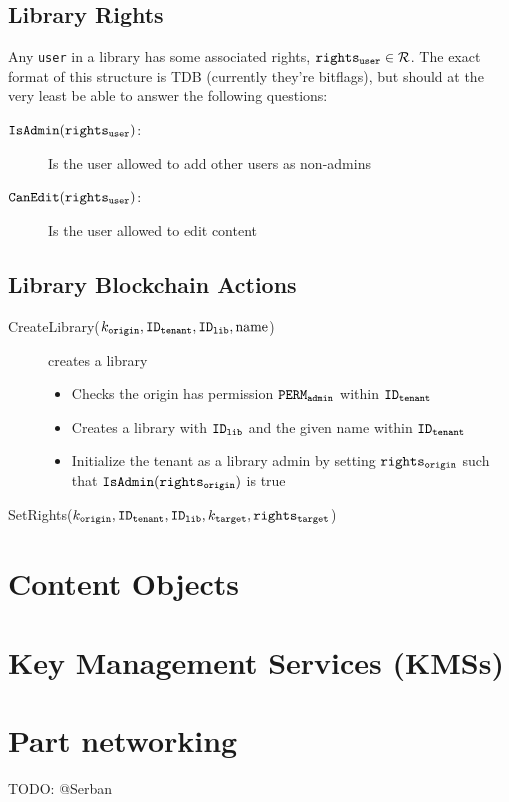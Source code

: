 \documentclass{article}
\begin{document}
\subsection{Library Rights}
Any \texttt{user} in a library has some associated rights, $\mathtt{rights_{user}} \in \mathcal{R}$. 
The exact format of this structure is TDB (currently they're bitflags), but should at the very least be able to answer the following questions:

\begin{description}
  \item[$\mathtt{IsAdmin}(\mathtt{rights_{user}})$:] Is the user allowed to add other users as non-admins
  \item[$\mathtt{CanEdit}(\mathtt{rights_{user}})$:]  Is the user allowed to edit content
\end{description}

\subsection{Library Blockchain Actions}

\begin{description}
  \item[CreateLibrary($k_\mathtt{origin}, \mathtt{ID_{tenant}}, \mathtt{ID_{lib}}, \textnormal{name}$)] creates a library
    \begin{itemize}
      \item Checks the origin has permission $\mathtt{PERM_{admin}}$ within $\mathtt{ID_{tenant}}$
      \item Creates a library with $\mathtt{ID_{lib}}$ and the given name within $\mathtt{ID_{tenant}}$
      \item Initialize the tenant as a library admin by setting $\mathtt{rights_{origin}}$ such that $\mathtt{IsAdmin}(\mathtt{rights_{origin}})$ is true
    \end{itemize}
  \item[SetRights($k_\mathtt{origin}, \mathtt{ID_{tenant}}, \mathtt{ID_{lib}}, k_\mathtt{target}, \mathtt{rights_{target}}$)]
\end{description}

\section{Content Objects}

\section{Key Management Services (KMSs)}



\section{Part networking}
TODO: @Serban
\end{document}
